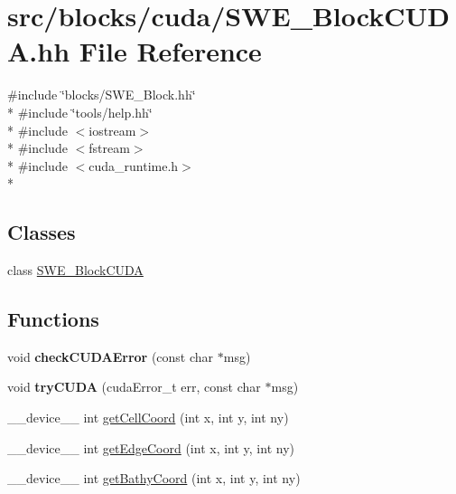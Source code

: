 \hypertarget{SWE__BlockCUDA_8hh}{\section{src/blocks/cuda/\-S\-W\-E\-\_\-\-Block\-C\-U\-D\-A.hh File Reference}
\label{SWE__BlockCUDA_8hh}
}
{\ttfamily \#include \char`\"{}blocks/\-S\-W\-E\-\_\-\-Block.\-hh\char`\"{}}\\*
{\ttfamily \#include \char`\"{}tools/help.\-hh\char`\"{}}\\*
{\ttfamily \#include $<$iostream$>$}\\*
{\ttfamily \#include $<$fstream$>$}\\*
{\ttfamily \#include $<$cuda\-\_\-runtime.\-h$>$}\\*
\subsection*{Classes}
\begin{DoxyCompactItemize}
\item 
class \hyperlink{classSWE__BlockCUDA}{S\-W\-E\-\_\-\-Block\-C\-U\-D\-A}
\end{DoxyCompactItemize}
\subsection*{Functions}
\begin{DoxyCompactItemize}
\item 
\hypertarget{SWE__BlockCUDA_8hh_a3b360c7adecc62da0141b3c82e753c77}{void {\bfseries check\-C\-U\-D\-A\-Error} (const char $\ast$msg)}\label{SWE__BlockCUDA_8hh_a3b360c7adecc62da0141b3c82e753c77}

\item 
\hypertarget{SWE__BlockCUDA_8hh_a0cda924127c6de7246554ed6b80917e5}{void {\bfseries try\-C\-U\-D\-A} (cuda\-Error\-\_\-t err, const char $\ast$msg)}\label{SWE__BlockCUDA_8hh_a0cda924127c6de7246554ed6b80917e5}

\item 
\-\_\-\-\_\-device\-\_\-\-\_\- int \hyperlink{SWE__BlockCUDA_8hh_a851d73679072ec13f3e3a9bd9dd4ddcc}{get\-Cell\-Coord} (int x, int y, int ny)
\item 
\-\_\-\-\_\-device\-\_\-\-\_\- int \hyperlink{SWE__BlockCUDA_8hh_acbd2e57b95983dbef453451ff7ddf9bb}{get\-Edge\-Coord} (int x, int y, int ny)
\item 
\-\_\-\-\_\-device\-\_\-\-\_\- int \hyperlink{SWE__BlockCUDA_8hh_add74cf6e6e3f322a5948a74fc7183cde}{get\-Bathy\-Coord} (int x, int y, int ny)
\end{DoxyCompactItemize}

